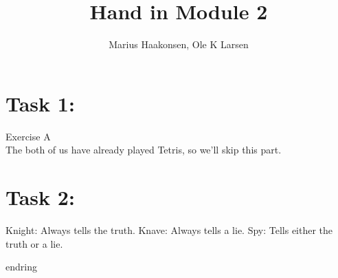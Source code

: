 \documentclass[11pt]{amsart}
\title{Hand in Module 2}
\author{Marius Haakonsen, Ole K Larsen}
\begin{document}
\maketitle

\section{Task 1:}

Exercise A  \\
The both of us have already played Tetris, so we'll skip this part.  \\





\section{Task 2:}

Knight: Always tells the truth.
Knave: Always tells a lie.
Spy: Tells either the truth or a lie.

endring
\end{document}
